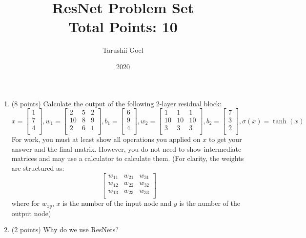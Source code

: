 \documentclass{article}
\title{ResNet Problem Set \\ Total Points: 10}
\author{Tarushii Goel}
\date{2020}
\begin{document}
\maketitle

\begin{enumerate}
	\item (8 points) Calculate the output of the following 2-layer residual block: 
	\begin{equation}
	x = \begin{bmatrix}
		1 \\
		7 \\
		4 \\
		\end{bmatrix},
	w_1 = \begin{bmatrix}
		2 & 5 & 2\\
		10 & 8 & 9\\
		2 & 6 & 1\\
		\end{bmatrix},
	b_1 = \begin{bmatrix}
		6 \\
		9 \\
		4 \\
		\end{bmatrix},
	w_2 = \begin{bmatrix}
		1 & 1 & 1\\
		10 & 10 & 10\\
		3 & 3 & 3\\
		\end{bmatrix},
	b_2= \begin{bmatrix}
		7 \\
		3 \\
		2 \\
		\end{bmatrix},
	\sigma(x) = \tanh(x)
	\end{equation}
	For work, you must at least show all operations you applied on $x$ to get your answer and the final matrix. However, you do not need to show intermediate matrices and may use a calculator to calculate them. 
	(For clarity, the weights are structured as: 
		$$ \begin{bmatrix}
		w_{11} & w_{21} & w_{31}\\
		w_{12} & w_{22} & w_{32}\\
		w_{13} & w_{23} & w_{33}\\
		\end{bmatrix} $$
		where for $w_{xy}$, $x$ is the number of the input node and $y$ is the number of the output node)
	\pagebreak 
	\item (2 points) Why do we use ResNets? 

\end {enumerate}
\end{document}
